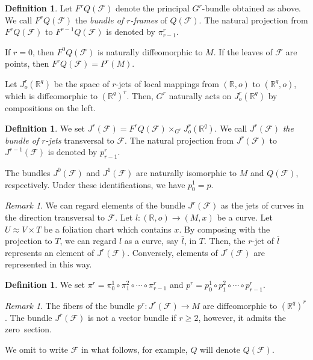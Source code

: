 \documentclass[12pt]{amsart}
\newcommand{\CF}{{\mathcal F}}
\newcommand{\R}{{\mathbb R}}
\theoremstyle{definition}
\newtheorem{definition}[theorem]{Definition}
\theoremstyle{remark}
\newtheorem{remark}[theorem]{Remark}
\begin{document}
\begin{definition}
Let $F^rQ(\CF)$ denote the principal $G^r$-bundle obtained as above.
We call $F^rQ(\CF)$ the \textit{bundle of $r$-frames} of $Q(\CF)$.
The natural projection from $F^rQ(\CF)$ to $F^{r-1}Q(\CF)$ is denoted by $\pi^r_{r-1}$.
\end{definition}

If $r=0$, then $F^0Q(\CF)$ is naturally diffeomorphic to $M$.
If the leaves of $\CF$ are points, then $F^rQ(\CF)=P^r(M)$.

Let $J^r_o(\R^q)$ be the space of $r$-jets of local mappings from $(\R,o)$ to $(\R^q,o)$, which is diffeomorphic to $(\R^q)^r$.
Then, $G^r$ naturally acts on $J^r_o(\R^q)$ by compositions on the left.

\begin{definition}
We set $J^r(\CF)=F^rQ(\CF)\times_{G^r}J^r_o(\R^q)$.
We call $J^r(\CF)$ \textit{the bundle of $r$-jets} transversal to $\CF$.
The natural projection from $J^r(\CF)$ to $J^{r-1}(\CF)$ is denoted by $p^r_{r-1}$.
\end{definition}

The bundles $J^0(\CF)$ and $J^1(\CF)$ are naturally isomorphic to $M$ and $Q(\CF)$, respectively.
Under these identifications, we have $p^1_0=p$.

\begin{remark}
We can regard elements of the bundle $J^r(\CF)$ as the jets of curves in the direction transversal to $\CF$.
Let $l\colon(\R,o)\to(M,x)$ be a curve.
Let $U\approx V\times T$ be a foliation chart which contains $x$.
By composing with the projection to $T$, we can regard $l$ as a curve, say $\overline{l}$, in $T$.
Then, the $r$-jet of $\overline{l}$ represents an element of $J^r(\CF)$.
Conversely, elements of $J^r(\CF)$ are represented in this way.
\end{remark}

\begin{definition}
We set $\pi^r=\pi^1_0\circ\pi^2_1\circ\cdots\circ\pi^r_{r-1}$ and $p^r=p^1_0\circ p^2_1\circ\cdots\circ p^r_{r-1}$.
\end{definition}

\begin{remark}
The fibers of the bundle $p^r\colon J^r(\CF)\to M$ are diffeomorphic to $(\R^q)^r$.
The bundle $J^r(\CF)$ is not a vector bundle if $r\geq2$, however, it admits the zero~section.
\end{remark}

We omit to write $\CF$ in what follows, for example, $Q$ will denote $Q(\CF)$.
\end{document}
